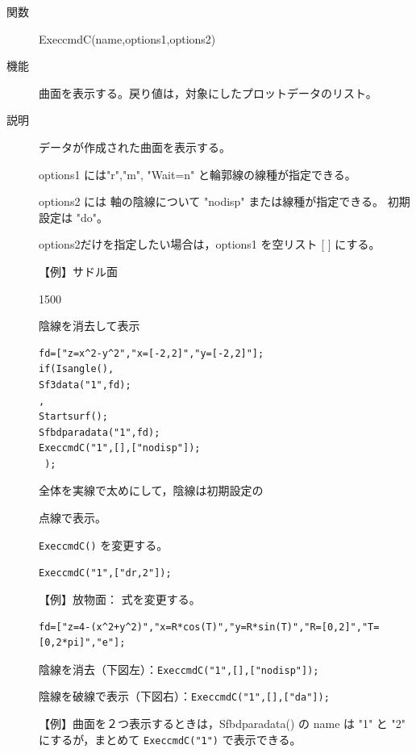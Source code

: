 \documentclass[papersize,a4paper,12pt,uplatex]{jsarticle}
\begin{document}
\begin{description}
\vspace{\baselineskip}
\hypertarget{execcmdc}{}
\item[関数]ExeccmdC(name,options1,options2)
\item[機能]曲面を表示する。戻り値は，対象にしたプロットデータのリスト。
\item[説明]データが作成された曲面を表示する。

options1 には"r","m", "Wait=n" と輪郭線の線種が指定できる。

options2 には 軸の陰線について "nodisp" または線種が指定できる。 初期設定は "do"。

options2だけを指定したい場合は，options1 を空リスト [ ] にする。

\vspace{\baselineskip}

【例】サドル面

\begin{layer}{150}{0}
\end{layer}

陰線を消去して表示
\begin{verbatim}
fd=["z=x^2-y^2","x=[-2,2]","y=[-2,2]"];
if(Isangle(),
Sf3data("1",fd);
,
Startsurf();
Sfbdparadata("1",fd);
ExeccmdC("1",[],["nodisp"]);
 );
\end{verbatim}
全体を実線で太めにして，陰線は初期設定の

点線で表示。

\verb|ExeccmdC()| を変更する。

\verb|ExeccmdC("1",["dr,2"]);|

\vspace{10mm}
【例】放物面： 式を変更する。
\begin{verbatim}
fd=["z=4-(x^2+y^2)","x=R*cos(T)","y=R*sin(T)","R=[0,2]","T=[0,2*pi]","e"];
\end{verbatim}

 陰線を消去（下図左）：\verb|ExeccmdC("1",[],["nodisp"]);|
 
 陰線を破線で表示（下図右）：\verb|ExeccmdC("1",[],["da"]);|
\begin{center}  \end{center}

【例】曲面を２つ表示するときは，Sfbdparadata() の name は "1" と "2" にするが，まとめて \verb|ExeccmdC("1")| で表示できる。


\end{description}
\end{document}
